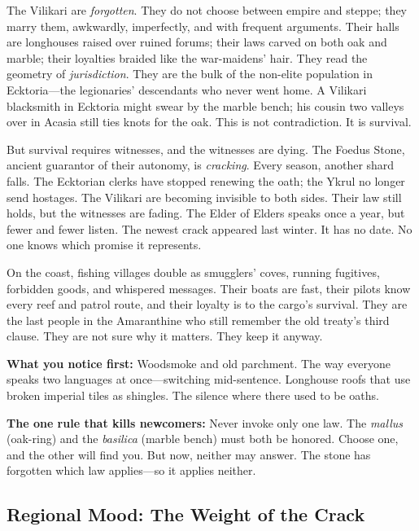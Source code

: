 \begin{tcolorbox}[colback=black!3,colframe=blue!60!black,title={Theme \& Atmosphere},breakable]
The Vilikari are \emph{forgotten}. They do not choose between empire and steppe; they marry them, awkwardly, imperfectly, and with frequent arguments. Their halls are longhouses raised over ruined forums; their laws carved on both oak and marble; their loyalties braided like the war-maidens' hair. They read the geometry of \emph{jurisdiction}. They are the bulk of the non-elite population in Ecktoria---the legionaries' descendants who never went home. A Vilikari blacksmith in Ecktoria might swear by the marble bench; his cousin two valleys over in Acasia still ties knots for the oak. This is not contradiction. It is survival.

But survival requires witnesses, and the witnesses are dying. The Foedus Stone, ancient guarantor of their autonomy, is \emph{cracking}. Every season, another shard falls. The Ecktorian clerks have stopped renewing the oath; the Ykrul no longer send hostages. The Vilikari are becoming invisible to both sides. Their law still holds, but the witnesses are fading. The Elder of Elders speaks once a year, but fewer and fewer listen. The newest crack appeared last winter. It has no date. No one knows which promise it represents.

On the coast, fishing villages double as smugglers' coves, running fugitives, forbidden goods, and whispered messages. Their boats are fast, their pilots know every reef and patrol route, and their loyalty is to the cargo's survival. They are the last people in the Amaranthine who still remember the old treaty's third clause. They are not sure why it matters. They keep it anyway.

\vspace{2mm}
\textbf{What you notice first:} Woodsmoke and old parchment. The way everyone speaks two languages at once---switching mid-sentence. Longhouse roofs that use broken imperial tiles as shingles. The silence where there used to be oaths.

\textbf{The one rule that kills newcomers:} Never invoke only one law. The \emph{mallus} (oak-ring) and the \emph{basilica} (marble bench) must both be honored. Choose one, and the other will find you. But now, neither may answer. The stone has forgotten which law applies---so it applies neither.
\end{tcolorbox}

\subsection*{Regional Mood: The Weight of the Crack}

